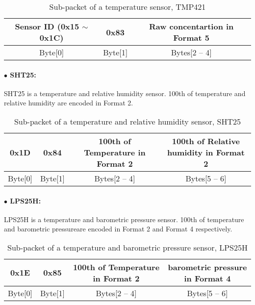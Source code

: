 \begin{table}[h!]
    \centering
    \caption{Sub-packet of a temperature sensor, TMP421}
    \begin{tabular}{|c|c|c|}
        \hline
        \rowcolor{black!8}
        \textbf{Sensor ID} (0x15 $\sim$ 0x1C) & \textbf{0x83} & \textbf{Raw concentartion in Format 5}\\
        \hline
        Byte[0] & Byte[1] & Bytes[2 -- 4] \\ \hline
    \end{tabular}
\end{table}


\paragraph{$\bullet$ SHT25:}

SHT25 is a temperature and relative humidity sensor. 100th of temperature and relative humidity are
encoded in Format 2.

\begin{table}[h!]
    \centering
    \caption{Sub-packet of a temperature and relative humidity sensor, SHT25}
    \begin{tabular}{|c|c|c|c|}
        \hline
        \rowcolor{black!8}
        \textbf{0x1D} & \textbf{0x84} & \textbf{100th of Temperature in Format 2} & \textbf{100th of Relative humidity in Format 2}\\
        \hline
        Byte[0] & Byte[1] & Bytes[2 -- 4] & Bytes[5 -- 6] \\ \hline
    \end{tabular}
\end{table}



\paragraph{$\bullet$ LPS25H:}

LPS25H is a temperature and barometric pressure sensor. 100th of temperature and barometric pressureare
encoded in Format 2 and Format 4 respectively.

\begin{table}[h!]
    \centering
    \caption{Sub-packet of a temperature and barometric pressure sensor, LPS25H}
    \begin{tabular}{|c|c|c|c|}
        \hline
        \rowcolor{black!8}
        \textbf{0x1E} & \textbf{0x85} & \textbf{100th of Temperature in Format 2} & \textbf{barometric pressure in Format 4}\\
        \hline
        Byte[0] & Byte[1] & Bytes[2 -- 4] & Bytes[5 -- 6] \\ \hline
    \end{tabular}
\end{table}


